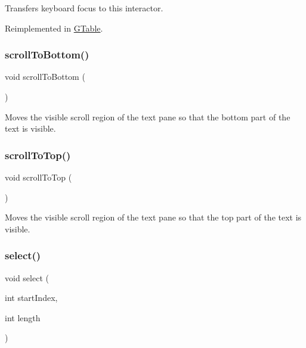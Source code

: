 Transfers keyboard focus to this interactor. 



Reimplemented in \mbox{\hyperlink{classGTable_a5921efd0a5a83eacebdadb749fb3ea7a}{G\+Table}}.

\mbox{\label{classGBrowserPane_ad4c9b6140b529865a6cdeed37a339237}} 
\subsubsection{\texorpdfstring{scroll\+To\+Bottom()}{scrollToBottom()}}
{\footnotesize\ttfamily void scroll\+To\+Bottom (\begin{DoxyParamCaption}{ }\end{DoxyParamCaption})\hspace{0.3cm}{\ttfamily [virtual]}}



Moves the visible scroll region of the text pane so that the bottom part of the text is visible. 

\mbox{\label{classGBrowserPane_a9eacfcf7c186936ed957dd1c8a9c6b64}} 
\subsubsection{\texorpdfstring{scroll\+To\+Top()}{scrollToTop()}}
{\footnotesize\ttfamily void scroll\+To\+Top (\begin{DoxyParamCaption}{ }\end{DoxyParamCaption})\hspace{0.3cm}{\ttfamily [virtual]}}



Moves the visible scroll region of the text pane so that the top part of the text is visible. 

\mbox{\label{classGBrowserPane_aaeb1320c0553d0d2b8081b750f59a34a}} 
\subsubsection{\texorpdfstring{select()}{select()}}
{\footnotesize\ttfamily void select (\begin{DoxyParamCaption}\item[{int}]{start\+Index,  }\item[{int}]{length }\end{DoxyParamCaption})\hspace{0.3cm}{\ttfamily [virtual]}}



